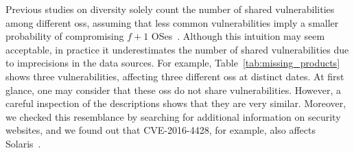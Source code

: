 

Previous studies on diversity solely count the number of shared vulnerabilities among different \glspl{os}, assuming that less common vulnerabilities imply a smaller probability of compromising $f+1$ OSes~\cite{Garcia:2014}. 
Although this intuition may seem acceptable, in practice it underestimates the number of shared vulnerabilities due to imprecisions in the data sources. 
For example, Table~\ref{tab:missing_products} shows three vulnerabilities, affecting three different \glspl{os} at distinct dates.
At first glance, one may consider that these \glspl{os} do not share vulnerabilities.
However, a careful inspection of the descriptions shows that they are very similar.
Moreover, we checked this resemblance by searching for additional information on security websites, and we found out that CVE-2016-4428, for example, also affects Solaris~\cite{solaris_report}.

